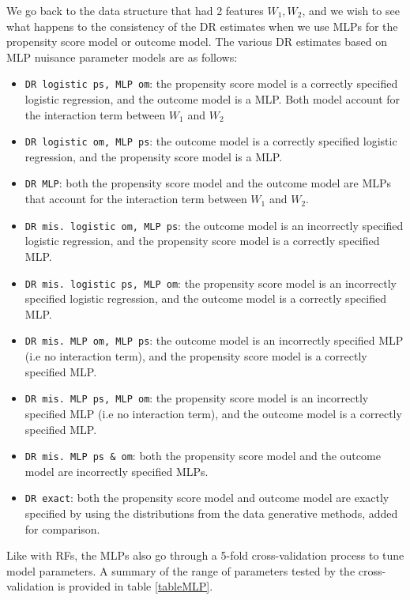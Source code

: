 \documentclass[12pt,twoside]{article}
\begin{document}
We go back to the data structure that had 2 features $W_1,W_2$, and we wish to see what happens to the consistency of the DR estimates when we use MLPs for the propensity score model or outcome model. The various DR estimates based on MLP nuisance parameter models are as follows: 
\begin{itemize}
    \item \texttt{DR logistic ps, MLP om}: the propensity score model is a correctly specified logistic regression, and the outcome model is a MLP. Both model account for the interaction term between $W_1$ and $W_2$
    \item \texttt{DR logistic om, MLP ps}: the outcome model is a correctly specified logistic regression, and the propensity score model is a MLP.
    \item \texttt{DR MLP}: both the propensity score model and the outcome model are MLPs that account for the interaction term between $W_1$ and $W_2$.
    \item \texttt{DR mis. logistic om, MLP ps}: the outcome model is an incorrectly specified logistic regression, and the propensity score model is a correctly specified MLP.
    \item \texttt{DR mis. logistic ps, MLP om}: the propensity score model is an incorrectly specified logistic regression, and the outcome model is a correctly specified MLP.
    \item \texttt{DR mis. MLP om, MLP ps}: the outcome model is an incorrectly specified MLP (i.e no interaction term), and the propensity score model is a correctly specified MLP.
    \item \texttt{DR mis. MLP ps, MLP om}: the propensity score model is an incorrectly specified MLP (i.e no interaction term), and the outcome model is a correctly specified MLP.
    \item \texttt{DR mis. MLP ps \& om}: both the propensity score model and the outcome model are incorrectly specified MLPs.
    \item \texttt{DR exact}: both the propensity score model and outcome model are exactly specified by using the distributions from the data generative methods, added for comparison.
\end{itemize}

Like with RFs, the MLPs also go through a 5-fold cross-validation process to tune model parameters. A summary of the range of parameters tested by the cross-validation is provided in table \ref{tableMLP}.
\end{document}
